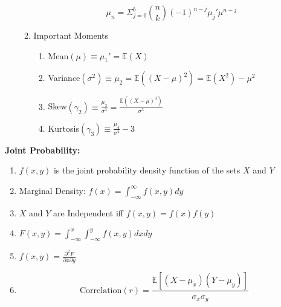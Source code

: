 \documentclass[12pt]{article}
\renewcommand{\=}[1]{\stackrel{#1}{=}} %
\theoremstyle{definition}
\theoremstyle{remark}
\begin{document}
\begin{enumerate}
\begin{enumerate}
    \begin{equation}
      \mu_n = \Sigma_{j=0}^b\binom{n}{k}(-1)^{n-j}\mu_j'\mu^{n-j}
    \end{equation}
  \item Important Moments
    \begin{enumerate}
    \item Mean$(\mu) \equiv \mu_1' = \mathbb{E}(X)$
    \item Variance$(\sigma^2) \equiv \mu_2 = \mathbb{E}((X-\mu)^2)=
      \mathbb{E}(X^2) - \mu^2$
    \item Skew$(\gamma_2) \equiv \frac{\mu_3}{\sigma^3} = \frac{\mathbb{E}((X-\mu)^3)}{\sigma^3}$
    \item Kurtosis$(\gamma_3) \equiv \frac{\mu_4}{\sigma^4} -3$
    \end{enumerate}
  \end{enumerate}
\end{enumerate}
\newpage
\textbf{Joint Probability:}
\begin{enumerate}
\item $f(x,y)$ is the joint probability density function of the sets
  $X$ and $Y$
\item Marginal Density: $f(x) = \int_{-\infty}^{\infty}f(x,y)dy$
\item $X$ and $Y$ are Independent iff $f(x,y) = f(x)f(y)$
\item $F(x,y) = \int_{-\infty}^{x}\int_{-\infty}^{y}f(x,y)dxdy$
\item $f(x,y) = \frac{\partial^2 F}{\partial x \partial y}$
\item
  \begin{equation}
    \textrm{Correlation}(r) =
    \frac{\mathbb{E}[(X-\mu_x)(Y-\mu_y)]}{\sigma_x \sigma_y}
  \end{equation}
\end{enumerate}
\end{document}
